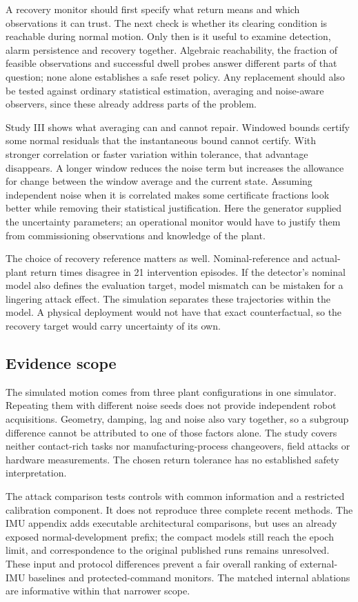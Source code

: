 \documentclass[11pt]{article}
\begin{document}
A recovery monitor should first specify what return means and which observations it can trust. The next check is whether its clearing condition is reachable during normal motion. Only then is it useful to examine detection, alarm persistence and recovery together. Algebraic reachability, the fraction of feasible observations and successful dwell probes answer different parts of that question; none alone establishes a safe reset policy. Any replacement should also be tested against ordinary statistical estimation, averaging and noise-aware observers, since these already address parts of the problem.

Study III shows what averaging can and cannot repair. Windowed bounds certify some normal residuals that the instantaneous bound cannot certify. With stronger correlation or faster variation within tolerance, that advantage disappears. A longer window reduces the noise term but increases the allowance for change between the window average and the current state. Assuming independent noise when it is correlated makes some certificate fractions look better while removing their statistical justification. Here the generator supplied the uncertainty parameters; an operational monitor would have to justify them from commissioning observations and knowledge of the plant.

The choice of recovery reference matters as well. Nominal-reference and actual-plant return times disagree in 21 intervention episodes. If the detector's nominal model also defines the evaluation target, model mismatch can be mistaken for a lingering attack effect. The simulation separates these trajectories within the model. A physical deployment would not have that exact counterfactual, so the recovery target would carry uncertainty of its own.

\subsection{Evidence scope}
The simulated motion comes from three plant configurations in one simulator. Repeating them with different noise seeds does not provide independent robot acquisitions. Geometry, damping, lag and noise also vary together, so a subgroup difference cannot be attributed to one of those factors alone. The study covers neither contact-rich tasks nor manufacturing-process changeovers, field attacks or hardware measurements. The chosen return tolerance has no established safety interpretation.

The attack comparison tests controls with common information and a restricted calibration component. It does not reproduce three complete recent methods. The IMU appendix adds executable architectural comparisons, but uses an already exposed normal-development prefix; the compact models still reach the epoch limit, and correspondence to the original published runs remains unresolved. These input and protocol differences prevent a fair overall ranking of external-IMU baselines and protected-command monitors. The matched internal ablations are informative within that narrower scope.
\end{document}
